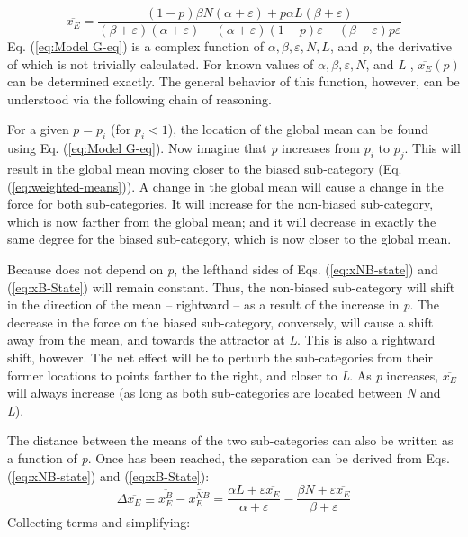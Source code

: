 \begin{equation}
\overline{x_{E}}=\frac{(1-p)\beta N(\alpha+\varepsilon)+p\alpha L(\beta+\varepsilon)}{(\beta+\varepsilon)(\alpha+\varepsilon)-(\alpha+\varepsilon)(1-p)\varepsilon-(\beta+\varepsilon)p\varepsilon}\label{eq:Model G-eq}
\end{equation}
Eq. (\ref{eq:Model G-eq}) is a complex function of $\alpha,\beta,\varepsilon,N,L$,
and \emph{p}, the derivative of which is not trivially calculated.
For known values of $\alpha,\beta,\varepsilon,N$, and \emph{L} ,
$\overline{x_{E}}(p)$ can be determined exactly. The general behavior
of this function, however, can be understood via the following chain
of reasoning. 

For a given $p=p_{i}$ (for $p_{i}<1$), the  location
of the global mean can be found using Eq. (\ref{eq:Model G-eq}).
Now imagine that \emph{p} increases from $p_{i}$ to $p_{j}$. This will
result in the global mean moving closer to the biased sub-category
(Eq. (\ref{eq:weighted-means})). A change in the global mean will
cause a change in the  force for both sub-categories.
It will increase for the non-biased sub-category, which is now farther
from the global mean; and it will decrease in exactly the same degree
for the biased sub-category, which is now closer to the global mean.

Because  does not depend on \emph{p}, the lefthand sides of
Eqs. (\ref{eq:xNB-state}) and (\ref{eq:xB-State}) will remain constant.
Thus, the non-biased sub-category will shift in the direction of the
mean – rightward – as a result of the increase in \emph{p}. The decrease
in the  force on the biased sub-category, conversely,
will cause a shift away from the mean, and towards the attractor at
\emph{L}. This is also a rightward shift, however. The net effect
will be to perturb the sub-categories from their former 
locations to points farther to the right, and closer to \emph{L}.
As \emph{p} increases, $\overline{x_{E}}$ will always increase (as
long as both sub-categories are located between \emph{N} and \emph{L}).

The distance between the means of the two sub-categories can also
be written as a function of \emph{p}. Once  has been reached,
the separation can be derived from Eqs. (\ref{eq:xNB-state}) and
(\ref{eq:xB-State}):
\begin{equation}
\Delta\overline{x_{E}}\equiv\overline{x_{E}^{B}}-\overline{x_{E}^{NB}}=\frac{\alpha L+\varepsilon\overline{x_{E}}}{\alpha+\varepsilon}-\frac{\beta N+\varepsilon\overline{x_{E}}}{\beta+\varepsilon}
\end{equation}
Collecting terms and simplifying:

